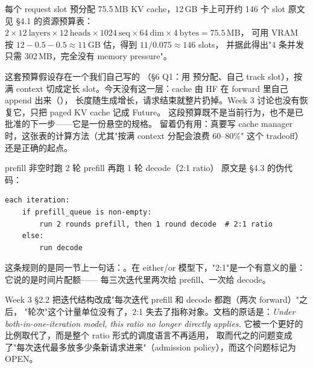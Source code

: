 \begin{retraction}{每个 request slot 预分配 75.5\,MB KV cache，12\,GB 卡上可开约 146 个 slot}
原文见  §4.1 的资源预算表：
$2 \times 12\ \text{layers} \times 12\ \text{heads} \times 1024\ \text{seq} \times 64\ \text{dim}
\times 4\ \text{bytes} = 75.5$\,MB，
可用 VRAM 按 $12 - 0.5 - 0.5 \approx 11$\,GB 估，得到 $11/0.075 \approx 146$ slots，
并据此得出"4 条并发只需 302\,MB，完全没有 memory pressure"。

这套预算假设存在一个我们自己写的
（§6 Q1：用  预分配、自己 track slot），按满 context
切成定长 slot。今天没有这一层：cache 由 HF 在 forward 里自己 append 出来（），
长度随生成增长，请求结束就整片扔掉。Week 3 讨论也没有恢复它，只把 paged KV cache 记成 Future。
这段预算既不是当前行为，也不是已批准的下一步——它是一份悬空的规格。
留着仍有用：真要写 cache manager 时，这张表的计算方法（尤其"按满 context 分配会浪费 60--80\%"
这个 tradeoff）还是正确的起点。
\end{retraction}

\begin{retraction}{prefill 非空时跑 2 轮 prefill 再跑 1 轮 decode（2:1 ratio）}
原文是  §4.3 的伪代码：
\begin{lstlisting}[style=hlplain]
each iteration:
    if prefill_queue is non-empty:
        run 2 rounds prefill, then 1 round decode  # 2:1 ratio
    else:
        run decode
\end{lstlisting}
这条规则的是同一节上一句话：。在 either/or 模型下，"2:1"是一个有意义的量：它说的是时间片配额——
每三次迭代里两次给 prefill、一次给 decode。

Week 3 §2.2 把迭代结构改成"每次迭代 prefill 和 decode 都跑（两次 forward）"之后，
"轮次"这个计量单位没有了，2:1 失去了指称对象。文档的原话是：\emph{Under both-in-one-iteration model,
this ratio no longer directly applies.}
它被一个更好的比例取代了，而是整个 ratio 形式的调度语言不再适用，
取而代之的问题变成了"每次迭代最多放多少条新请求进来"（admission policy），而这个问题标记为 OPEN。
\end{retraction}

